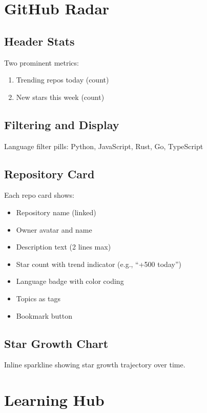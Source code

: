 \documentclass{report}
\begin{document}
\section{GitHub Radar}

\subsection{Header Stats}

Two prominent metrics:
\begin{enumerate}
    \item Trending repos today (count)
    \item New stars this week (count)
\end{enumerate}

\subsection{Filtering and Display}

Language filter pills: Python, JavaScript, Rust, Go, TypeScript

\subsection{Repository Card}

Each repo card shows:
\begin{itemize}
    \item Repository name (linked)
    \item Owner avatar and name
    \item Description text (2 lines max)
    \item Star count with trend indicator (e.g., ``+500 today'')
    \item Language badge with color coding
    \item Topics as tags
    \item Bookmark button
\end{itemize}

\subsection{Star Growth Chart}

Inline sparkline showing star growth trajectory over time.

\section{Learning Hub}
\end{document}
